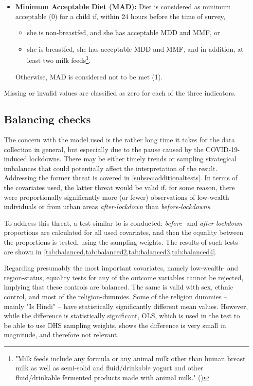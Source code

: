 \documentclass[12pt,a4paper,notitlepage]{article}
\begin{document}
\begin{itemize}
\begin{itemize}
        \item \textbf{Minimum Acceptable Diet (MAD):} Diet is considered as minimum acceptable (0) for a child if, within 24 hours before the time of survey,
        \begin{itemize}
            \item she is non-breastfed, and she has acceptable MDD and MMF, or
            \item she is breastfed, she has acceptable MDD and MMF, and in addition, at least two milk feeds\footnote{"Milk feeds include any formula or any animal milk other than human breast milk as well as semi-solid and fluid/drinkable yogurt and other fluid/drinkable fermented products made with animal milk." (\citet{who2021FoodIndicators})}.
        \end{itemize}
        Otherwise, MAD is considered not to be met (1).
    \end{itemize}

    Missing or invalid values are classified as zero for each of the three indicators.
\end{itemize}

\subsection{Balancing checks} \label{subsec:balancing}

The concern with the model used is the rather long time it takes for the data collection in general, but especially due to the pause caused by the COVID-19-induced lockdowns. There may be either timely trends or sampling strategical imbalances that could potentially affect the interpretation of the result. Addressing the former threat is covered in \cref{subsec:additionaltests}. In terms of the covariates used, the latter threat would be valid if, for some reason, there were proportionally significantly more (or fewer) observations of low-wealth individuals or from urban areas \textit{after-lockdown} than \textit{before-lockdowns}.

To address this threat, a test similar to \citet{Bassi:2017} is conducted: \textit{before}- and \textit{after-lockdown} proportions are calculated for all used covariates, and then the equality between the proportions is tested, using the sampling weights. The results of such tests are shown in \cref{tab:balanced,tab:balanced2,tab:balanced3,tab:balanced4}.

Regarding presumably the most important covariates, namely low-wealth- and region-status, equality tests for any of the outcome variables cannot be rejected, implying that these controls are balanced. The same is valid with sex, ethnic control, and most of the religion-dummies. Some of the religion dummies -- mainly "Is Hindi" -- have statistically significantly different mean values. However, while the difference is statistically significant, OLS, which is used in the test to be able to use DHS sampling weights, shows the difference is very small in magnitude, and therefore not relevant.
\end{document}
